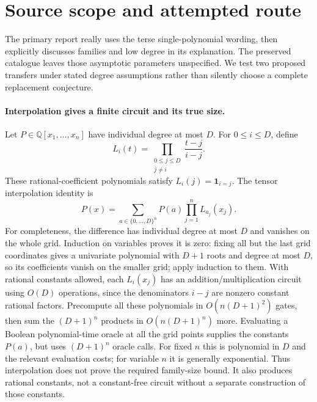\documentclass[11pt]{article}
\begin{document}
\section{Source scope and attempted route}
The primary report really uses the terse single-polynomial wording, then
explicitly discusses families and low degree in its explanation. The preserved
catalogue leaves those asymptotic parameters unspecified. We test two proposed
transfers under stated degree assumptions rather than silently choose a complete
replacement conjecture.

\paragraph{Interpolation gives a finite circuit and its true size.}
Let $P\in\mathbb Q[x_1,\ldots,x_n]$ have individual degree at most $D$.
For $0\le i\le D$, define
\[
L_i(t)=\prod_{\substack{0\le j\le D\\j\ne i}}\frac{t-j}{i-j}.
\]
These rational-coefficient polynomials satisfy $L_i(j)=\mathbf1_{i=j}$.
The tensor interpolation identity is
\[
P(x)=\sum_{a\in\{0,\ldots,D\}^n}P(a)\prod_{j=1}^n L_{a_j}(x_j).
\]
For completeness, the difference has individual degree at most $D$ and
vanishes on the whole grid. Induction on variables proves it is zero: fixing
all but the last grid coordinates gives a univariate polynomial with $D+1$
roots and degree at most $D$, so its coefficients vanish on the smaller grid;
apply induction to them.
With rational constants allowed, each $L_i(x_j)$ has an addition/multiplication
circuit using $O(D)$ operations, since the denominators $i-j$ are nonzero
constant rational factors. Precompute all these polynomials in
$O(n(D+1)^2)$ gates, then sum the $(D+1)^n$ products in
$O(n(D+1)^n)$ more. Evaluating a Boolean polynomial-time oracle at all the
grid points supplies the constants $P(a)$, but uses $(D+1)^n$ oracle calls.
For fixed $n$ this is polynomial in $D$ and the relevant evaluation costs;
for variable $n$ it is generally exponential. Thus interpolation does not
prove the required family-size bound. It also produces rational constants,
not a constant-free circuit without a separate construction of those constants.
\end{document}
